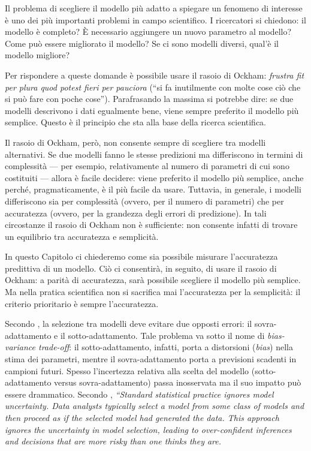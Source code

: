 \documentclass[
  11pt,
]{krantz}
\theoremstyle{definition}
\theoremstyle{definition}
\theoremstyle{definition}
\theoremstyle{definition}
\theoremstyle{remark}
\begin{document}
Il problema di scegliere il modello più adatto a spiegare un fenomeno di interesse è uno dei più importanti problemi in campo scientifico. I ricercatori si chiedono: il modello è completo? È necessario aggiungere un nuovo parametro al modello? Come può essere migliorato il modello? Se ci sono modelli diversi, qual'è il modello migliore?

Per rispondere a queste domande è possibile usare il rasoio di Ockham: \emph{frustra fit per plura quod potest fieri per pauciora} (``si fa inutilmente con molte cose ciò che si può fare con poche cose''). Parafrasando la massima si potrebbe dire: se due modelli descrivono i dati egualmente bene, viene sempre preferito il modello più semplice. Questo è il principio che sta alla base della ricerca scientifica.

Il rasoio di Ockham, però, non consente sempre di scegliere tra modelli alternativi. Se due modelli fanno le stesse predizioni ma differiscono in termini di complessità --- per esempio, relativamente al numero di parametri di cui sono costituiti --- allora è facile decidere: viene preferito il modello più semplice, anche perché, pragmaticamente, è il più facile da usare. Tuttavia, in generale, i modelli differiscono sia per complessità (ovvero, per il numero di parametri) che per accuratezza (ovvero, per la grandezza degli errori di predizione). In tali circostanze il rasoio di Ockham non è sufficiente: non consente infatti di trovare un equilibrio tra accuratezza e semplicità.

In questo Capitolo ci chiederemo come sia possibile misurare l'accuratezza predittiva di un modello. Ciò ci consentirà, in seguito, di usare il rasoio di Ockham: a parità di accuratezza, sarà possibile scegliere il modello più semplice. Ma nella pratica scientifica non si sacrifica mai l'accuratezza per la semplicità: il criterio prioritario è sempre l'accuratezza.

Secondo \citet{McElreath_rethinking}, la selezione tra modelli deve evitare due opposti errori: il sovra-adattamento e il sotto-adattamento. Tale problema va sotto il nome di \emph{bias-variance trade-off}: il sotto-adattamento, infatti, porta a distorsioni (\emph{bias}) nella stima dei parametri, mentre il sovra-adattamento porta a previsioni scadenti in campioni futuri. Spesso l'incertezza relativa alla scelta del modello (sotto-adattamento versus sovra-adattamento) passa inosservata ma il suo impatto può essere drammatico. Secondo \citet{hoeting1999bayesian}, \emph{``Standard statistical practice ignores model uncertainty. Data analysts typically select a model from some class of models and then proceed as if the selected model had generated the data. This approach ignores the uncertainty in model selection, leading to over-confident inferences and decisions that are more risky than one thinks they are.}
\end{document}
